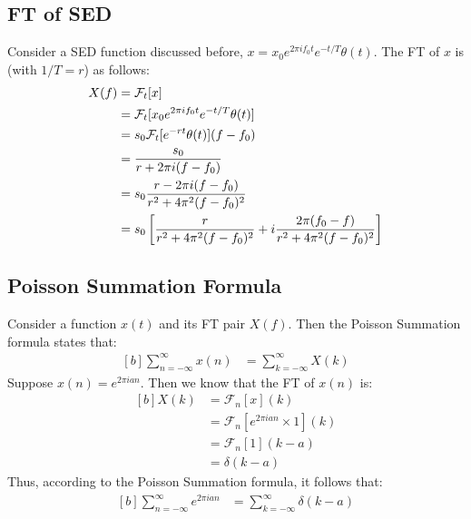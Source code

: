 \documentclass[letterpaper, 11pt]{article}
\newcommand{\fourier}[2]{\mathcal{F}_{#1}[#2]} %
\newcommand{\sed}[2]{#2_{0}e^{2\pi if_{0}#1}e^{-#1/T} \theta (#1)} %
\newcommand{\fsum}[1]{\sum_{#1 = -\infty}^{\infty}}
\numberwithin{equation}{section}
\numberwithin{figure}{section}
\begin{document}
\subsection{FT of SED}
Consider a SED function discussed before, \(x = \sed{t}{x}\). The FT of \(x\) is (with \(1/T = r\)) as follows:
\begin{equation}
	\begin{aligned}[b]
		X(f)	&= \fourier{t}{x}\\
			&= \fourier{t}{\sed{t}{x}}\\
			&= s_{0}\fourier{t}{e^{-rt} \theta (t)}(f - f_{0})\\
			&= \frac{s_{0}}{r + 2\pi i(f - f_{0})} \\
			\gdef\temp{r^2 + 4\pi^{2}(f - f_{0})^2} %
			&= s_{0}\frac{r - 2\pi i(f - f_{0})}{\temp}\\
			&= s_{0}\left[\frac{r}{\temp} + i\frac{2\pi(f_{0} - f)}{\temp} \right]
	\end{aligned}
\end{equation}

\subsection{Poisson Summation Formula}
Consider a function \(x(t)\) and its FT pair \(X(f)\). Then the Poisson Summation formula states that:
\begin{equation}
	\begin{aligned}[b]
		\fsum{n} x(n)	&= \fsum{k} X(k)
	\end{aligned}
\end{equation}
Suppose \(x(n) = e^{2 \pi ian}\). Then we know that the FT of \(x(n)\) is:
\begin{equation}
	\begin{aligned}[b]
		X(k)	&= \fourier{n}{x}(k) \\
			&= \fourier{n}{e^{2 \pi ian} \times 1}(k) \\
			&= \fourier{n}{1}(k - a) \\
			&= \delta (k - a)
	\end{aligned}
\end{equation}
Thus, according to the Poisson Summation formula, it follows that:
\begin{equation}
	\begin{aligned}[b]
		\fsum{n} e^{2 \pi ian}
			&= \fsum{k} \delta (k - a)
			\label{eq:poisson}
	\end{aligned}
\end{equation}
\end{document}
